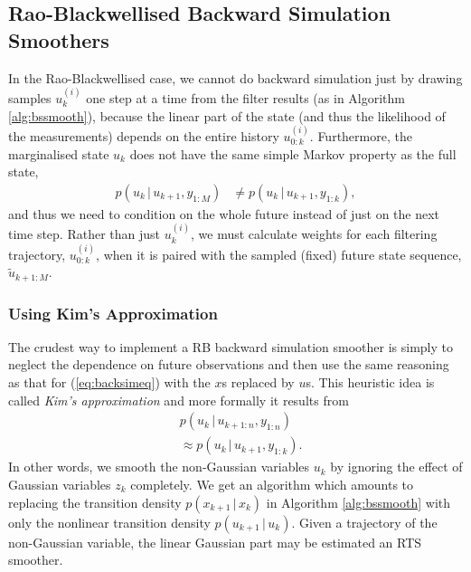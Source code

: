 \documentclass[twocolumn]{autart}    %
\begin{document}
\subsection{Rao-Blackwellised Backward Simulation Smoothers}
%
In the Rao-Blackwellised case, we cannot do backward simulation just by drawing samples $u_k^{(i)}$ one step at a time from the filter results (as in Algorithm \ref{alg:bssmooth}), because the linear part of the state (and thus the likelihood of the measurements) depends on the entire history $u^{(i)}_{0:k}$. Furthermore, the marginalised state $u_k$ does not have the same simple Markov property as the full state,
%
\begin{equation}
  \begin{split}
    p(u_{k}\,|\,u_{k+1},y_{1:M})
    &\ne p(u_{k}\,|\,u_{k+1},y_{1:k}),
  \end{split}
  \nonumber
\end{equation}
%
and thus we need to condition on the whole future instead of just on the next time step. Rather than just $u^{(i)}_{k}$, we must calculate weights for each filtering trajectory, $u^{(i)}_{0:k}$, when it is paired with the sampled (fixed) future state sequence, $\tilde{u}_{k+1:M}$.

\subsubsection{Using Kim's Approximation}
%
The crudest way to implement a RB backward simulation smoother is simply to neglect the dependence on future observations and then use the same reasoning as that for (\ref{eq:backsimeq}) with the $x$s replaced by $u$s. This heuristic idea is called {\em Kim's approximation} \cite{Kim:1994,Barber:2006} and more formally it results from
%
\begin{equation}
\begin{split}
 &p(u_{k} \,|\, u_{k+1:n},y_{1:n}) \\
  &\approx p(u_{k} \,|\, u_{k+1},y_{1:k}).
\end{split}
\end{equation}
%
In other words, we smooth the non-Gaussian variables $u_k$ by ignoring the effect of Gaussian variables $z_k$ completely. We get an algorithm which amounts to replacing the transition density $p(x_{k+1}\,|\,x_{k})$ in Algorithm \ref{alg:bssmooth} with only the nonlinear transition density $p(u_{k+1}\,|\,u_{k})$. Given a trajectory of the non-Gaussian variable, the linear Gaussian part may be estimated an RTS smoother.
\end{document}
